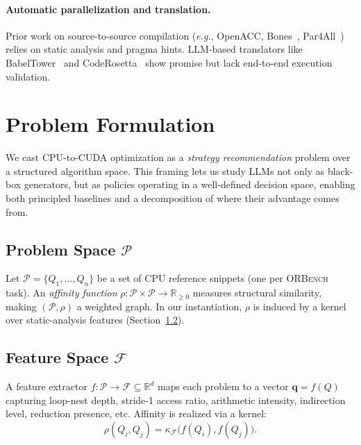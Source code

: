 \documentclass{article}
\begin{document}
\paragraph{Automatic parallelization and translation.}
Prior work on source-to-source compilation (\emph{e.g.}, OpenACC,
Bones~\citep{bones}, Par4All~\citep{par4all}) relies on static analysis
and pragma hints. LLM-based translators like
BabelTower~\citep{babeltower} and CodeRosetta~\citep{coderosetta} show
promise but lack end-to-end execution validation.

\section{Problem Formulation}
\label{sec:formulation}

We cast CPU-to-CUDA optimization as a \emph{strategy recommendation}
problem over a structured algorithm space. This framing lets us study
LLMs not only as black-box generators, but as policies operating in a
well-defined decision space, enabling both principled baselines and a
decomposition of where their advantage comes from.

\subsection{Problem Space $\mathcal{P}$}
Let $\mathcal{P} = \{Q_1, \ldots, Q_n\}$ be a set of CPU reference
snippets (one per \textsc{ORBench} task). An \emph{affinity function}
$\rho : \mathcal{P} \times \mathcal{P} \to \mathbb{R}_{\geq 0}$
measures structural similarity, making $(\mathcal{P}, \rho)$ a
weighted graph. In our instantiation, $\rho$ is induced by a kernel
over static-analysis features (Section~\ref{sec:feature}).

\subsection{Feature Space $\mathcal{F}$}
\label{sec:feature}
A feature extractor $f : \mathcal{P} \to \mathcal{F} \subseteq
\mathbb{R}^d$ maps each problem to a vector $\mathbf{q} = f(Q)$
capturing loop-nest depth, stride-1 access ratio, arithmetic
intensity, indirection level, reduction presence, etc. Affinity is
realized via a kernel:
\begin{equation}
\rho(Q_i, Q_j) = \kappa_\mathcal{F}\bigl(f(Q_i), f(Q_j)\bigr).
\label{eq:affinity}
\end{equation}
\end{document}

